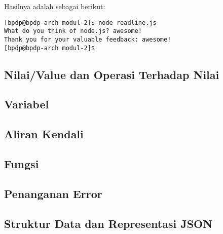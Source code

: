 Hasilnya adalah sebagai berikut:

\lstset{language=bash,caption=Hasil eksekusi readline.js}
\begin{lstlisting}
[bpdp@bpdp-arch modul-2]$ node readline.js 
What do you think of node.js? awesome!
Thank you for your valuable feedback: awesome!
[bpdp@bpdp-arch modul-2]$
\end{lstlisting}

\subsection{Nilai/Value dan Operasi Terhadap Nilai}


\subsection{Variabel}


\subsection{Aliran Kendali}

\subsection{Fungsi}

\subsection{Penanganan Error}

\subsection{Struktur Data dan Representasi JSON}

